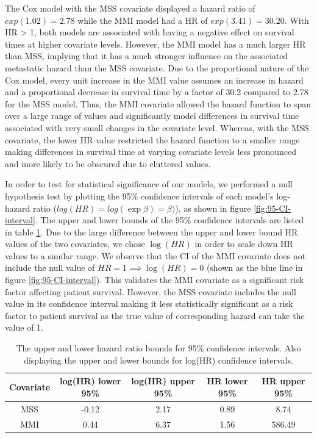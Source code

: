 \documentclass{l4proj}
\begin{document}
The Cox model with the MSS covariate displayed a hazard ratio of \(exp(1.02) = 2.78\) while the MMI model had a HR of \(exp(3.41) = 30.20\). With HR > 1, both models are associated with having a negative effect on survival times at higher covariate levels. However, the MMI model has a much larger HR than MSS, implying that it has a much stronger influence on the associated metastatic hazard than the MSS covariate. Due to the proportional nature of the Cox model, every unit increase in the MMI value assumes an increase in hazard and a proportional decrease in survival time by a factor of 30.2 compared to 2.78 for the MSS model. Thus, the MMI covariate allowed the hazard function to span over a large range of values and significantly model differences in survival time associated with very small changes in the covariate level. Whereas, with the MSS covariate, the lower HR value restricted the hazard function to a smaller range making differences in survival time at varying covariate levels less pronounced and more likely to be obscured due to cluttered values.  

In order to test for statistical significance of our models, we performed a null hypothesis test by plotting the 95\% confidence intervals of each model's log-hazard ratio (\(log(HR) = log(\exp{\beta}) = \beta)\)), as shown in figure \ref{fig:95-CI-interval}. The upper and lower bounds of the 95\% confidence intervals are listed in table \ref{tab:CI-stats}. Due to the large difference between the upper and lower bound HR values of the two covariates, we chose \(\log(HR)\) in order to scale down HR values  to a similar range. We observe that the CI of the MMI covariate does not include the null value of \(HR = 1 \implies \log(HR) = 0\) (shown as the blue line in figure \ref{fig:95-CI-interval}). This validates the MMI covariate as a significant risk factor affecting patient survival. However, the MSS covariate includes the null value in its confidence interval making it less statistically significant as a risk factor to patient survival as the true value of corresponding hazard can take the value of 1. 

\begin{table}[h]
    \centering
    \begin{tabular}{c|c|c|c|c}
    \hline 
         Covariate&log(HR) lower 95\%&log(HR) upper 95\%&HR lower 95\%&HR upper 95\%\\ \hline
         MSS & -0.12 & 2.17 & 0.89 & 8.74  \\
         MMI& 0.44 & 6.37 & 1.56 & 586.49 
    \end{tabular}
    \caption{The upper and lower hazard ratio bounds for 95\% confidence intervals. Also displaying the upper and lower bounds for log(HR) confidence intervals. }
    \label{tab:CI-stats}
\end{table}
\end{document}
